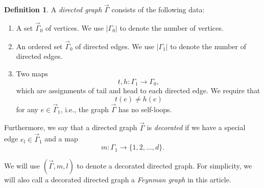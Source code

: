 \documentclass[11pt]{amsart}
\theoremstyle{definition}
\newtheorem{defn}[thm]{Definition}
\theoremstyle{remark}
\numberwithin{equation}{section}
\begin{document}
%
\begin{defn}
  A \textit{directed graph} $\vec{\Gamma}$ consists of the following data:
    \begin{enumerate}
        \item A set $\vec{\Gamma}_{0}$ of vertices. We use $|\Gamma_{0}|$ to denote the number of vertices.
        \item An ordered set $\vec{\Gamma}_{0}$ of directed edges. We use $|\Gamma_{1}|$ to denote the number of directed edges.
        \item Two maps
        $$
        t,h:\Gamma_{1}\rightarrow\Gamma_{0},
        $$
        which are assignments of tail and head to each directed edge. We require that 
        $$
        t(e)\neq h(e)
        $$
        for any $e\in\vec{\Gamma}_{1}$, i.e., the graph $\vec{\Gamma}$ has no self-loops.
    \end{enumerate}
    Furthermore, we say that a directed graph $\vec{\Gamma}$ is \textit{decorated} if we have a special edge $e_{l}\in \vec{\Gamma}_{1}$ and a map 
    $$
    m \colon \Gamma_{1}\rightarrow\{1,2,\dots,d\}.
    $$
\end{defn}

We will use $(\vec{\Gamma},m,l)$ to denote a decorated directed graph. For simplicity, we will also call a decorated
directed graph a \textit{Feynman graph} in this article.
\end{document}
